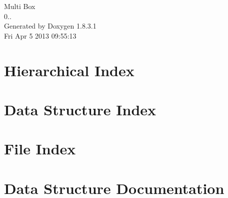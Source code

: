 \documentclass{book}
\begin{document}
\hypersetup{pageanchor=false,citecolor=blue}
\begin{titlepage}
\vspace*{7cm}
\begin{center}
{\Large Multi Box \\[1ex]\large 0.. }\\
\vspace*{1cm}
{\large Generated by Doxygen 1.8.3.1}\\
\vspace*{0.5cm}
{\small Fri Apr 5 2013 09:55:13}\\
\end{center}
\end{titlepage}
\clearemptydoublepage
{}
\tableofcontents
\clearemptydoublepage
{}
\hypersetup{pageanchor=true,citecolor=blue}
\chapter{Hierarchical Index}

\chapter{Data Structure Index}

\chapter{File Index}

\chapter{Data Structure Documentation}
























\end{document}
